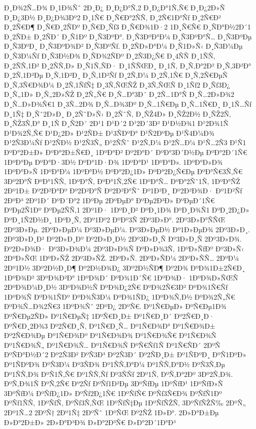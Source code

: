 {Ð¸Ð¾2Ñ…Ð¾
Ð¸1Ð¾Ñˆ
2Ð¸Ð¿
Ð¸Ð¿Ð°Ñ‚2
Ð¸Ð¿Ð°1Ñ‚Ñ€
Ð¸Ð¿2Ð»Ñ
Ð¸Ð¿3Ð½
Ð¸Ð¿Ð¾3Ðº2
Ð¸1Ñ€
Ð¸Ñ€Ð°2ÑÑ‚
Ð¸2Ñ€1Ð°Ñƒ
Ð¸2Ñ€Ð²
Ð¸2Ñ€Ð¶
Ð¸Ñ€Ð¸2ÑÐº
Ð¸Ñ€Ð¸Ñƒ3
Ð¸Ñ€Ð¾1Ð·2
1Ð¸Ñ€Ñ€
Ð¸ÑÐ°Ð½2Ð´1
Ð¸2ÑÐ±
Ð¸2ÑÐ´
Ð¸Ñ1Ðº
Ð¸Ñ3ÐºÐ°.
Ð¸Ñ3ÐºÐ°Ð¼
Ð¸Ñ3ÐºÐ°Ñ…
Ð¸Ñ3ÐºÐµ
Ð¸Ñ3ÐºÐ¸
Ð¸Ñ3ÐºÐ¾Ð²
Ð¸Ñ3ÐºÑƒ.
Ð¸2ÑÐ»Ð°Ð¼
Ð¸Ñ1Ð»Ñ‹
Ð¸Ñ3Ð¼Ðµ
Ð¸Ñ3Ð¼Ñƒ
Ð¸Ñ3Ð½Ð¾
Ð¸ÑÐ¾2ÑÐº
Ð¸2Ñ3Ð¿Ñ€
Ð¸4ÑÑ
Ð¸1ÑÑ‚
Ð¸2ÑÑ‚1Ð²
Ð¸2ÑÑ‚Ð»
Ð¸Ñ1Ñ‚ÑÐ·
Ð¸1ÑÑŒÐ¸
Ð¸1Ñ‚
Ð¸Ñ‚Ð°2Ð²
Ð¸Ñ‚3Ð²Ð°
Ð¸2Ñ‚1Ð²Ðµ
Ð¸Ñ‚1Ð²Ð¸
Ð¸Ñ‚1Ð²Ñƒ
Ð¸2Ñ‚Ð¼
Ð¸2Ñ‚1Ñ€
Ð¸Ñ‚2Ñ€ÐµÑ
Ð¸Ñ‚3Ñ€Ð¾Ð¼
Ð¸2Ñ‚1ÑƒÑ‡
Ð¸3Ñ‚ÑŒÑŽ
Ð¸3Ñ‚ÑŒÑ
Ð¸1Ñƒ2
Ð¸Ñƒ3Ð¿
Ð¸Ñ„1Ð»
Ð¸Ñ„2Ð»ÑŽ
Ð¸2Ñ„Ñ€
Ð¸Ñ…Ð°3Ð´
Ð¸2Ñ…1Ð°Ñ
Ð¸Ñ…2Ð»Ð¾2
Ð¸Ñ…Ð»Ð¾Ñ€1
Ð¸3Ñ…2Ð¾
Ð¸Ñ…Ð¾3Ðº
Ð¸Ñ…1Ñ€Ðµ
Ð¸Ñ…1Ñ€Ð¸
Ð¸1Ñ…Ñƒ
Ð¸1Ñ‡
Ð¸Ñˆ2Ð»Ð¸
Ð¸2ÑˆÐ»Ñ‹
Ð¸2ÑˆÑ‚
Ð¸ÑŽ4Ð»
Ð¸ÑŽ2Ð½
Ð¸ÑŽ2Ñ‚
Ð¸ÑŽ3Ñ‚Ð°
Ð¸1Ñ
Ð¸Ñ2Ð´
2Ð¹1
Ð¹Ð´2
Ð¹2Ð´3Ð²
Ð¹Ð½Ð¾1
Ð¹2Ð¾1Ñ
Ð¹Ð¾2Ñ‚Ñ€
Ð¹Ð¿2Ð»
Ð¹2ÑÐ±
Ð¹3ÑÐºÐ°
Ð¹Ñ2ÐºÐµ
Ð¹Ñ4Ð¼Ð¾
Ð¹2Ñ3Ð¼Ñƒ
Ð¹2ÑÐ½
Ð¹2Ñ3Ñ„
Ð¹2ÑÑˆ
Ð¹2Ñ‚Ð¼
Ð¹2Ñ…Ð¼
Ð¹Ñ…2Ñ3
Ð¹Ñ1
ÐºÐ°2Ð±Ð»
ÐºÐ°2Ð±Ñ€Ð¸
1ÐºÐ°Ð²
Ðº2Ð°Ð´
ÐºÐ°3Ð´Ð½Ðµ
ÐºÐ°2Ð´1Ñ€
1ÐºÐ°Ðµ
ÐºÐ°Ð·3Ð½
ÐºÐ°1Ð·Ð¾
1ÐºÐ°Ð¹
1ÐºÐ°Ð».
1ÐºÐ°Ð»Ð¾
1ÐºÐ°Ð»Ñ
1ÐºÐ°Ð¼
1ÐºÐ°Ð½
ÐºÐ°2Ð¿1Ð»
ÐºÐ°2Ð¿Ñ€Ðµ
ÐºÐ°Ñ€3Ñ‚Ñ€
3Ðº2Ð°Ñ
ÐºÐ°1ÑÑ‚
1ÐºÐ°Ñ‚
ÐºÐ°1Ñ‚2Ñ€
1ÐºÐ°Ñ…
ÐºÐ°2Ñˆ1Ñ‚
1ÐºÐ°ÑŽ
2Ðº1Ð±
Ðº2Ð²Ð°Ðº
Ðº2Ð²Ð°Ñ
Ðº2Ð²Ð°Ñˆ
Ðº1Ð²Ð¸
Ðº2Ð²Ð¾Ð·
Ðº1Ð²Ñƒ
2ÐºÐ³
2Ðº1Ð´
ÐºÐ´Ð°2
1ÐºÐµ
2ÐºÐµÐ°
ÐºÐµ2Ð³Ð»
ÐºÐµÐ´1Ñ€
ÐºÐµ2Ñ1Ðº
ÐºÐµ2ÑÑ‚1
2Ðº1Ð·
1ÐºÐ¸Ð²
ÐºÐ¸1Ð¾
ÐºÐ¸Ð¾Ñ1
ÐºÐ¸2Ð¿Ð»
ÐºÐ¸1Ñ2Ð½Ð¸
1ÐºÐ¸Ñ‚
2Ðº1Ðº2
ÐºÐº3Ñ
2Ðº3Ð»Ð°.
2Ðº3Ð»Ð°ÑÑŒ
2Ðº3Ð»Ðµ.
2ÐºÐ»ÐµÐ¼
Ðº3Ð»ÐµÐ¼.
Ðº3Ð»ÐµÐ½
Ðº1Ð»ÐµÐ¾
2Ðº3Ð»Ð¸.
2Ðº3Ð»Ð¸Ð²
Ðº2Ð»Ð¸Ðº
Ðº2Ð»Ð¸Ð½
2Ðº3Ð»Ð¸Ñ
Ðº3Ð»Ð¸Ñ
2Ðº3Ð»Ð¾.
Ðº2Ð»Ð¾Ð·
Ðº3Ð»Ð¾Ð¼
2Ðº3Ð»Ð¾Ñ
ÐºÐ»Ð¾3Ñ‚
1ÐºÐ»ÑƒÐº
Ðº3Ð»Ñ‹
2ÐºÐ»ÑŒ
1ÐºÐ»ÑŽ
2Ðº3Ð»ÑŽ.
2ÐºÐ»Ñ.
2ÐºÐ»ÑÐ¼
2ÐºÐ»ÑÑ…
2ÐºÐ¼
2Ðº1Ð½
3Ðº2Ð½Ð¸Ð¶
Ðº2Ð½Ð¾Ð¿
3Ðº2Ð½ÑÐ¶
Ðº2Ð¾
ÐºÐ¾1Ð±2Ñ€Ð¸
1ÐºÐ¾Ð²
3ÐºÐ¾Ð²Ð°
1ÐºÐ¾Ð´
ÐºÐ¾1Ð´Ñ€
1ÐºÐ¾Ð·
1ÐºÐ¾Ð»ÑŒÑ
2ÐºÐ¾Ð¼Ð¸Ð½
3ÐºÐ¾Ð½Ñ
ÐºÐ¾Ð¿2Ñ€
ÐºÐ¾2Ñ€3Ð²
ÐºÐ¾1Ñ€Ñƒ
1ÐºÐ¾Ñ
ÐºÐ¾1ÑÐº
ÐºÐ¾Ñ3Ð¼
ÐºÐ¾1ÑÐ¿
1ÐºÐ¾Ñ‚Ð½
ÐºÐ¾2Ñ„Ñ€
ÐºÐ¾Ñ…Ð¾2Ñ€3
1ÐºÐ¾Ñˆ
2ÐºÐ¿
2ÐºÑ€.
Ðº1Ñ€ÐµÐ»
ÐºÑ€Ðµ1Ð¾
ÐºÑ€Ðµ2ÑÐ»
Ðº1Ñ€ÐµÑ‡
1ÐºÑ€Ð¸Ð±
Ðº1Ñ€Ð¸Ð´
Ðº2Ñ€Ð¸Ð·
ÐºÑ€Ð¸2Ð¾3
Ðº2Ñ€Ð¸Ñ‚
Ðº1Ñ€Ð¸Ñ…
Ðº1Ñ€Ð¾Ð°
Ðº1Ñ€Ð¾Ð±
Ðº2Ñ€Ð¾Ðµ
Ðº1Ñ€Ð¾Ðº
Ðº1Ñ€Ð¾Ð¾
Ðº1Ñ€Ð¾Ñ€
Ðº1Ñ€Ð¾Ñ
Ðº1Ñ€Ð¾Ñ„
Ðº1Ñ€Ð¾Ñ…
Ðº1Ñ€Ð¾Ñ
ÐºÑ€Ñƒ1Ñ
Ðº1Ñ€ÑÐ´
2ÐºÑ
ÐºÑÐ°Ð½Ð´2
Ðº2Ñ3Ð²
ÐºÑ3Ð³
Ðº2Ñ3Ð´
Ðº2ÑÐ¸Ð±
Ðº1ÑÐºÐ¸
ÐºÑ1ÐºÐ»
Ðº1ÑÐºÐ¾
ÐºÑ3Ð¼
Ðº3ÑÐ¾
Ðº1ÑÑ‚Ð°Ð¼
Ðº1ÑÑ‚Ð°Ð½
ÐºÑ3Ñ‚Ðµ
Ðº1ÑÑ‚Ð¾
ÐºÑ1Ñ‚Ñ€
Ðº1ÑÑ‚Ñƒ
Ðº3ÑÑƒ
2Ðº1Ñ‚
ÐºÑ‚Ð°2Ðº
3Ðº2Ñ‚Ð¾.
ÐºÑ‚Ð¾1Ñ
ÐºÑ‚2Ñ€
Ðº2Ñƒ
ÐºÑƒ1Ð²Ðµ
3ÐºÑƒÐµ
1ÐºÑƒÐ¹
1ÐºÑƒÐ»Ñ
3ÐºÑƒÐ¼
ÐºÑƒÐ¿1Ð»
ÐºÑƒ2Ð¿1Ñ€
1ÐºÑƒÑ€
ÐºÑƒ3Ñ€Ð¾
ÐºÑƒÑ1Ðº
ÐºÑƒ1ÑÑ‚
1ÐºÑƒÑ‚
ÐºÑƒ3Ñ‚ÑŒ
1ÐºÑƒÑ‡Ðµ
1ÐºÑƒÑŽÑ‚
3ÐºÑƒÑŽÑ‰
2ÐºÑ„
2Ðº1Ñ…2
2ÐºÑ†
2Ðº1Ñ‡
2ÐºÑˆ
1ÐºÑŒ
Ðº2ÑŽ
1Ð»Ð°.
2Ð»Ð°Ð±Ðµ
Ð»Ð°2Ð±Ð»
2Ð»Ð°Ð³Ð¾
Ð»Ð°2Ð³Ñ€
Ð»Ð°2Ð´1Ð°Ð³
}
